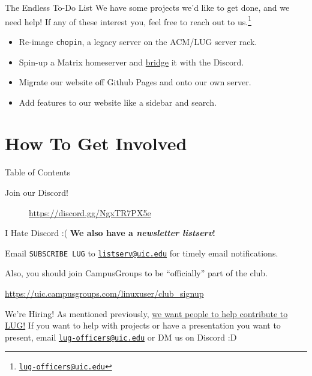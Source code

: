 \documentclass{beamer}
\begin{document}
\begin{frame}{The Endless To-Do List}
	We have some projects we'd like to get done, and we need help! If any
	of these interest you, feel free to reach out to us.\footnote{
		\href{mailto:lug-officers@uic.edu}{\texttt{lug-officers@uic.edu}}}
	\pause

	\begin{itemize}
		\item Re-image \texttt{chopin}, a legacy server on the ACM/LUG
			server rack.
		\item Spin-up a Matrix homeserver and \underline{bridge} it
			with the Discord.
		\item Migrate our website off Github Pages and onto our own
			server.
		\item Add features to our website like a sidebar and search.
	\end{itemize}
\end{frame}

\section{How To Get Involved}
\begin{frame}{Table of Contents}
	\tableofcontents[currentsection]
\end{frame}

\begin{frame}{Join our Discord!}
	\begin{figure}
		\centering
		
		\caption{\url{https://discord.gg/NgxTR7PX5e}}
	\end{figure}
\end{frame}

\begin{frame}{I Hate Discord \>:(}
	\textbf{We also have a \textit{newsletter listserv}!}

	Email \texttt{SUBSCRIBE LUG} to
	\href{mailto:listserv@uic.edu}{\texttt{listserv@uic.edu}} for timely
	email notifications.

	Also, you should join CampusGroups to be ``officially'' part of the club.

	\url{https://uic.campusgroups.com/linuxuser/club\_signup}
\end{frame}

\begin{frame}{We're Hiring!}
	As mentioned previously, \underline{we want people to help contribute
	to LUG!} \pause If you want to help with projects or have a
	presentation you want to present, email
	\href{mailto:lug-officers@uic.edu}{\texttt{lug-officers@uic.edu}} or DM
	us on Discord :D
\end{frame}
\end{document}
